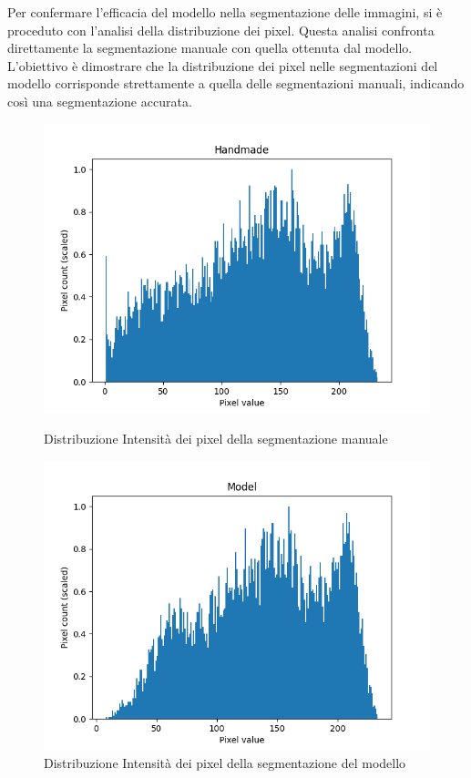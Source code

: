 Per confermare l'efficacia del modello nella segmentazione delle immagini, si è proceduto con
l'analisi della distribuzione dei pixel. Questa analisi confronta direttamente la segmentazione
manuale con quella ottenuta dal modello. L'obiettivo è dimostrare che la distribuzione dei pixel
nelle segmentazioni del modello corrisponde strettamente a quella delle segmentazioni manuali,
indicando così una segmentazione accurata.

\begin{figure}[!ht]
    \centering
    \begin{minipage}{0.45\columnwidth}
        \centering
        \includegraphics[width=\linewidth]{Immagini/handmade_scaled_hist.png}
        \caption{Distribuzione Intensità dei pixel della segmentazione manuale}
        \label{fig:distribuzione intensità dei pixel della segmentazione manuale}
    \end{minipage}
    \hfill
    \begin{minipage}{0.45\columnwidth}
        \centering
        \includegraphics[width=\linewidth]{Immagini/model_scaled_hist.png}
        \caption{Distribuzione Intensità dei pixel della segmentazione del modello}
        \label{fig:distribuzione intensità dei pixel della segmentazione del modello}
    \end{minipage}
\end{figure}

